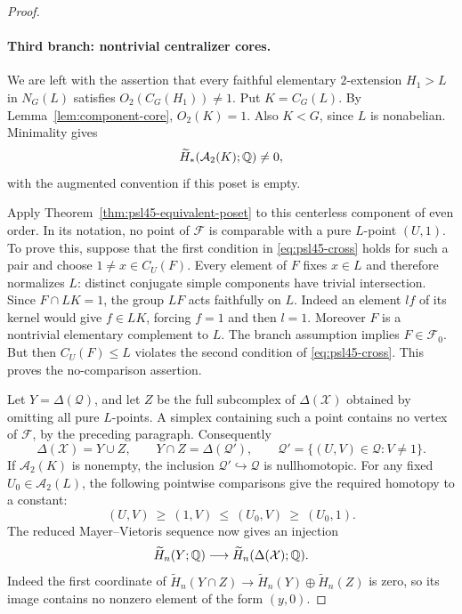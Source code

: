 \begin{proof}
\paragraph{Third branch: nontrivial centralizer cores.}
We are left with the assertion that every faithful elementary
$2$-extension $H_1>L$ in $N_G(L)$ satisfies
$O_2(C_G(H_1))\ne1$. Put $K=C_G(L)$. By
Lemma~\ref{lem:component-core}, $O_2(K)=1$. Also $K<G$,
since $L$ is nonabelian. Minimality gives
\begin{equation}\label{eq:psl45-K-homology}
 \widetilde H_*(\mathcal A_2(K);\mathbb Q)\ne0,
\end{equation}
with the augmented convention if this poset is empty.

Apply Theorem~\ref{thm:psl45-equivalent-poset} to this centerless
component of even order. In its notation, no point of
$\mathcal F$ is comparable with a pure $L$-point $(U,1)$.
To prove this, suppose that the first condition in
\eqref{eq:psl45-cross} holds for such a pair and choose
$1\ne x\in C_U(F)$. Every element of $F$ fixes $x\in L$ and
therefore normalizes $L$: distinct conjugate simple components
have trivial intersection. Since $F\cap LK=1$, the group
$LF$ acts faithfully on $L$. Indeed an element $lf$ of its
kernel would give $f\in LK$, forcing $f=1$ and then $l=1$.
Moreover $F$ is a nontrivial elementary complement to $L$.
The branch assumption implies $F\in\mathcal F_0$.
But then $C_U(F)\leq L$ violates the second condition of
\eqref{eq:psl45-cross}. This proves the no-comparison assertion.

Let $Y=\Delta(\mathcal Q)$, and let $Z$ be the full subcomplex
of $\Delta(\mathcal X)$ obtained by omitting all pure $L$-points.
A simplex containing such a point contains no vertex of
$\mathcal F$, by the preceding paragraph. Consequently
\[
 \Delta(\mathcal X)=Y\cup Z,\qquad
 Y\cap Z=\Delta(\mathcal Q'),\qquad
 \mathcal Q'=\{(U,V)\in\mathcal Q:V\ne1\}.
\]
If $\mathcal A_2(K)$ is nonempty, the inclusion
$\mathcal Q'\hookrightarrow\mathcal Q$ is nullhomotopic.
For any fixed $U_0\in\mathcal A_2(L)$, the following pointwise
comparisons give the required homotopy to a constant:
\[
 (U,V)\ \geq\ (1,V)\ \leq\ (U_0,V)\ \geq\ (U_0,1).
\]
The reduced Mayer--Vietoris sequence now gives an injection
\begin{equation}\label{eq:psl45-MV}
 \widetilde H_n(Y;\mathbb Q)\longrightarrow
                    \widetilde H_n(\Delta(\mathcal X);\mathbb Q).
\end{equation}
Indeed the first coordinate of
$\widetilde H_n(Y\cap Z)\to
 \widetilde H_n(Y)\oplus\widetilde H_n(Z)$ is zero, so its image
contains no nonzero element of the form $(y,0)$.


\end{proof}
